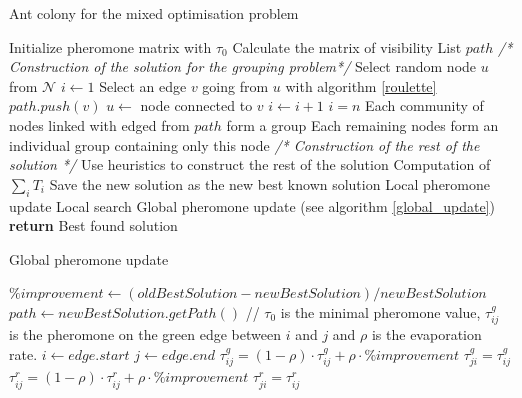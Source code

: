 \documentclass[UTF8, twoside]{EPURapport}
\begin{document}
\begin{algorithm}
  \caption{Ant colony for the mixed optimisation problem}
  \begin{algorithmic}[1]
  	  \State Initialize pheromone matrix with $\tau_0$
  	  \State Calculate the matrix of visibility
  	  \State List $path$
      		\State \textit{/* Construction of the solution for the grouping problem*/}
			\State Select random node $u$ from $\mathscr{N}$
    		\State $i \gets 1$
    		\Repeat
    			\State Select an edge $v$ going from $u$ with algorithm \ref{roulette}
   				\State $path.push(v)$
   				\State $u \gets $ node connected to $v$
   				\State $i \gets i+1$
    		\Until $i = n$
    		\State Each community of nodes linked with edged from $path$ form a group
    		\State Each remaining nodes form an individual group containing only this node
    		\State \textit{/* Construction of the rest of the solution */}
    		\State Use heuristics to construct the rest of the solution
    		\State Computation of $\underset{i}{\sum} T_i$
    			\State Save the new solution as the new best known solution
    		\EndIf
			\State Local pheromone update
        \EndFor
        \State Local search
        \State Global pheromone update (see algorithm \ref{global_update})
      \EndFor
      \State \textbf{return} Best found solution
  \end{algorithmic}
\end{algorithm}

\begin{algorithm}
	\caption{Global pheromone update}
	\begin{algorithmic}[1]
		\State $\%improvement \gets (oldBestSolution - newBestSolution) / newBestSolution$
		\State $path \gets newBestSolution.getPath()$
				\State // $\tau_0$ is the minimal pheromone value, $\tau_{ij}^g$ is the pheromone on the green edge between $i$ and $j$ and $\rho$ is the evaporation rate.
				\State $i \gets edge.start$ 
				\State $j \gets edge.end$
				\State $\tau_{ij}^g = (1-\rho) \cdot \tau_{ij}^g + \rho \cdot \%improvement$
				\State $\tau_{ji}^g = \tau_{ij}^g$
			\Else
				\State $\tau_{ij}^r = (1-\rho) \cdot \tau_{ij}^r + \rho \cdot \%improvement$
				\State $\tau_{ji}^r = \tau_{ij}^r$
			\EndIf
		\EndFor
	\end{algorithmic}
	\label{global_update}  	  
\end{algorithm}
\end{document}
